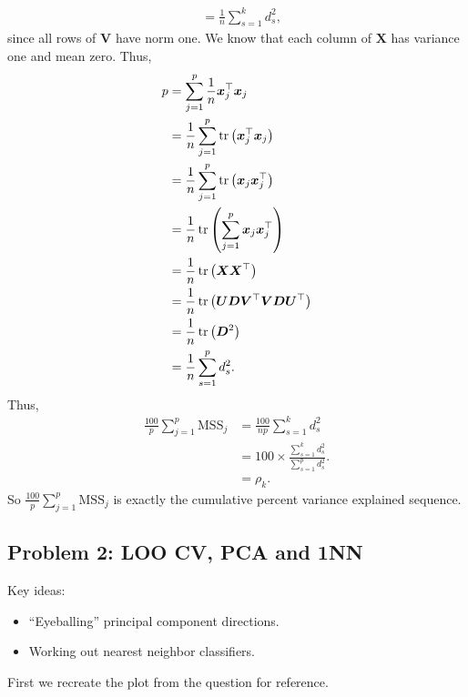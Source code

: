\begin{enumerate}[label=(\alph*)]
\begin{align*}
        &=\frac{1}{n}\sum_{s=1}^k d_s^2,
    \end{align*}
    since all rows of $\bm{V}$ have norm one. We know that each column of $\bm{X}$ has variance one and mean zero. Thus,
    \begin{align*}
        p&=\sum_{j=1}^p \frac{1}{n} \bm{x}_j^\top \bm{x}_j\\
        &=\frac{1}{n}\sum_{j=1}^p \operatorname{tr}\left(\bm{x}_j^\top \bm{x}_j\right)\\
        &=\frac{1}{n}\sum_{j=1}^p \operatorname{tr}\left(\bm{x}_j\bm{x}_j^\top \right)\\
        &=\frac{1}{n}\operatorname{tr}\left(\sum_{j=1}^p \bm{x}_j\bm{x}_j^\top \right)\\
        &=\frac{1}{n}\operatorname{tr}\left(\bm{X}\bm{X}^\top\right)\\
        &=\frac{1}{n}\operatorname{tr}\left(\bm{U}\bm{D}\bm{V}^\top \bm{V}\bm{D}\bm{U}^\top\right)\\
        &=\frac{1}{n}\operatorname{tr}\left(\bm{D}^2\right)\\
        &=\frac{1}{n}\sum_{s=1}^p d_s^2.
    \end{align*}
    Thus,
    \begin{align*}
        \frac{100}{p}\sum_{j=1}^p \mathrm{MSS}_j &=\frac{100}{np} \sum_{s=1}^k d_s^2\\
        &=100 \times \frac{\sum_{s=1}^k d_s^2}{\sum_{s=1}^p d_s^2}.\\
        &=\rho_k.
    \end{align*}
    So $\frac{100}{p}\sum_{j=1}^p \mathrm{MSS}_j$ is exactly the cumulative percent variance explained sequence.
\end{enumerate}

\subsection*{Problem 2: LOO CV, PCA and 1NN}

Key ideas:
\begin{itemize}
    \item ``Eyeballing'' principal component directions.
    \item Working out nearest neighbor classifiers.
\end{itemize}

First we recreate the plot from the question for reference.

